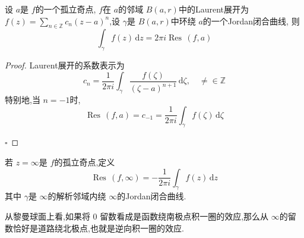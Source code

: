\documentclass[../../复变函数.tex]{subfiles}
\begin{document}
\begin{theorem}
    设 \(  a  \)是 \(  f  \)的一个孤立奇点, \(  f  \)在 \(  a  \)的邻域 \(  B\left( a,r \right)   \)中的Laurent展开为 \(  f\left( z \right)= \sum _{n\in \mathbb{Z} }c_{n}\left( z-a \right)^{n}    \),设 \(   \gamma   \)是 \(  B\left( a,r \right)   \)中环绕 \(  a  \)的一个Jordan闭合曲线,   则 \[
    \int_{ \gamma }f\left( z \right)\,\mathrm{d} z= 2\pi i\operatorname{Res}\,\left( f,a \right)  
    \]
\end{theorem}
\begin{proof}
    Laurent展开的系数表示为 \[
    c_{n}= \frac{1 }{2\pi i } \int_{ \gamma }\frac{f\left( \zeta  \right)  }{\left( \zeta -a \right)^{n+ 1}  }\,\mathrm{d} \zeta ,\quad \neq \in \mathbb{Z}   
    \]特别地,当  \(  n = -1  \)时, \[
    \operatorname{Res}\,\left( f,a \right)= c_{-1}=  \frac{1 }{2\pi i } \int_{ \gamma }f\left( \zeta  \right)\,\mathrm{d} \zeta    
    \] 

    \hfill $\square$
\end{proof}


\begin{definition}
    若 \(  z= \infty  \)是 \(  f  \)的孤立奇点,定义 \[
    \operatorname{Res}\,\left( f,\infty \right)= -\frac{1 }{2\pi i } \int_{ \gamma }f\left( z \right)\,\mathrm{d} z   
    \] 其中 \(   \gamma   \)是 \(  \infty  \)的解析邻域内绕 \(  \infty  \)的Jordan闭合曲线.   
\end{definition}

\begin{note}
    从黎曼球面上看,如果将 \(  0  \) 留数看成是函数绕南极点积一圈的效应,那么从 \(  \infty  \)的留数恰好是道路绕北极点,也就是逆向积一圈的效应.
\end{note}
\end{document}
